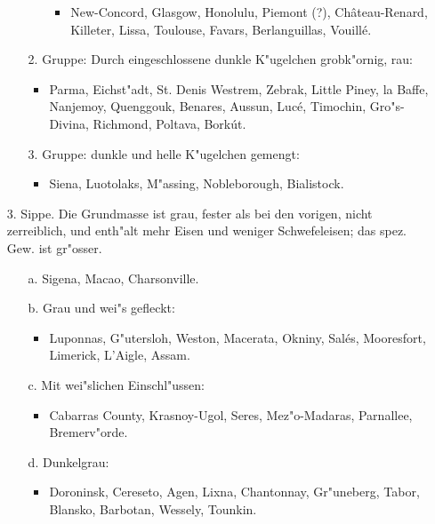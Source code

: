 \documentclass[a4paper, 11pt, oneside]{article}
\begin{document}
\begin{itemize}
\begin{itemize}
\begin{itemize}
\begin{itemize}
                \item New-Concord, Glasgow, Honolulu, Piemont (?), Château-Renard, Killeter, Lissa, Toulouse, Favars, Berlanguillas, Vouillé.
            \end{itemize}
        \end{itemize}
        \item[2.] Gruppe: Durch eingeschlossene dunkle K"ugelchen grobk"ornig, rau:
        \begin{itemize}
            \item Parma, Eichst"adt, St. Denis Westrem, Zebrak, Little Piney, la Baffe, Nanjemoy, Quenggouk, Benares, Aussun, Lucé, Timochin, Gro"s-Divina, Richmond, Poltava, Borkút.
        \end{itemize}
        \item[3.] Gruppe: dunkle und helle K"ugelchen gemengt:
        \begin{itemize}
            \item Siena, Luotolaks, M"assing, Nobleborough, Bialistock.
        \end{itemize}
    \end{itemize}
    \item[3. Sippe.] Die Grundmasse ist grau, fester als bei den vorigen, nicht zerreiblich, und enth"alt mehr Eisen und weniger Schwefeleisen; das spez. Gew. ist gr"osser.
    \begin{itemize}
        \item[a.] Sigena, Macao, Charsonville.
        \item[b.] Grau und wei"s gefleckt:
        \begin{itemize}
            \item Luponnas, G"utersloh, Weston, Macerata, Okniny, Salés, Mooresfort, Limerick, L'Aigle, Assam.
        \end{itemize}
        \item[c.] Mit wei"slichen Einschl"ussen:
        \begin{itemize}
            \item Cabarras County, Krasnoy-Ugol, Seres, Mez"o-Madaras, Parnallee, Bremerv"orde.
        \end{itemize}
        \item[d.] Dunkelgrau:
        \begin{itemize}
            \item Doroninsk, Cereseto, Agen, Lixna, Chantonnay, Gr"uneberg, Tabor, Blansko, Barbotan, Wessely, Tounkin.
        \end{itemize}

\end{itemize}
\end{itemize}
\end{document}
